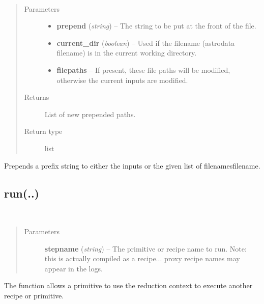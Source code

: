 \documentclass[letterpaper,10pt,english]{sphinxmanual}
\begin{document}
\begin{fulllineitems}
\label{chapter_ReductionContextClass:astrodata.RecipeManager.ReductionContext.prepend_names}~\begin{quote}\begin{description}
\item[{Parameters}] \leavevmode\begin{itemize}
\item {} 
\textbf{prepend} (\emph{string}) -- The string to be put at the front of the file.

\item {} 
\textbf{current\_dir} (\emph{boolean}) -- Used if the filename (astrodata filename) is in the
current working directory.

\item {} 
\textbf{filepaths} -- If present, these file paths will be modified, otherwise
the current inputs are modified.

\end{itemize}

\item[{Returns}] \leavevmode
List of new prepended paths.

\item[{Return type}] \leavevmode
list

\end{description}\end{quote}

Prepends a prefix string to either the inputs or the given list of filenamesfilename.

\end{fulllineitems}



\subsection{run(..)}
\label{chapter_ReductionContextClass:run}

\begin{fulllineitems}
\label{chapter_ReductionContextClass:astrodata.RecipeManager.ReductionContext.run}~\begin{quote}\begin{description}
\item[{Parameters}] \leavevmode
\textbf{stepname} (\emph{string}) -- The primitive or recipe name to run. Note: this is 
actually compiled as a recipe... proxy recipe names may appear
in the logs.

\end{description}\end{quote}

The  function allows a primitive to use the reduction
context to execute another recipe or primitive.

\end{fulllineitems}
\end{document}
